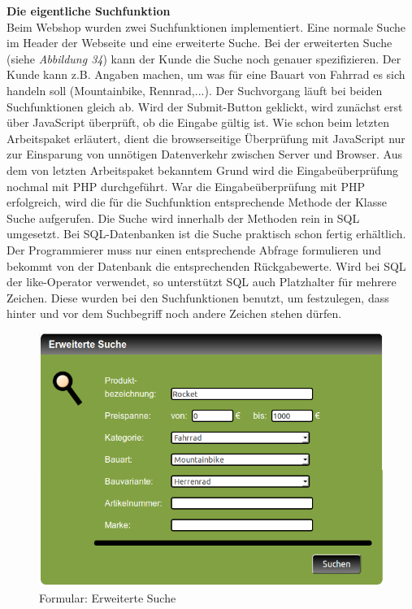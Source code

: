\newpage
\textbf{Die eigentliche Suchfunktion}\\
Beim Webshop wurden zwei Suchfunktionen implementiert. Eine \glqq normale\grqq{} Suche im Header der Webseite und eine \glqq erweiterte\grqq{} Suche. Bei der erweiterten Suche (siehe \textit{Abbildung 34}) kann der Kunde die Suche noch genauer spezifizieren. Der Kunde kann z.B. Angaben machen, um was für eine Bauart von Fahrrad es sich handeln soll (Mountainbike, Rennrad,...). Der Suchvorgang läuft bei beiden Suchfunktionen gleich ab. Wird der Submit-Button geklickt, wird zunächst erst über JavaScript überprüft, ob die Eingabe gültig ist. Wie schon beim letzten Arbeitspaket erläutert, dient die browserseitige Überprüfung mit JavaScript nur zur Einsparung von unnötigen Datenverkehr zwischen Server und Browser. Aus dem von letzten Arbeitspaket bekanntem Grund wird die Eingabeüberprüfung nochmal mit PHP durchgeführt. War die Eingabeüberprüfung mit PHP erfolgreich, wird die für die Suchfunktion entsprechende Methode der Klasse \glqq Suche\grqq{} aufgerufen. Die Suche wird innerhalb der Methoden rein in SQL umgesetzt. Bei SQL-Datenbanken ist die Suche praktisch schon fertig erhältlich. Der Programmierer muss nur einen entsprechende Abfrage formulieren und bekommt von der Datenbank die entsprechenden Rückgabewerte. Wird bei SQL der \glqq like\grqq{}-Operator verwendet, so unterstützt SQL auch Platzhalter für mehrere Zeichen. Diese wurden bei den Suchfunktionen benutzt, um festzulegen, dass hinter und vor dem Suchbegriff noch andere Zeichen stehen dürfen.

\begin{figure}[H]
	\begin{center}
			\includegraphics[width=115mm]{Bilder/erweiterte_suche.png}
	\end{center}
	\caption{Formular: Erweiterte Suche}
\end{figure}

